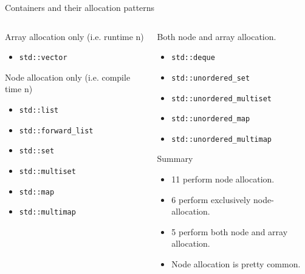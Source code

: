 \documentclass[10pt,aspectratio=169]{beamer}
\begin{document}
\begin{frame}{Containers and their allocation patterns}
\begin{columns}
\begin{column}{0.5\textwidth}
Array allocation only (i.e. runtime n)
\begin{itemize}
\item \texttt{std::vector}
\end{itemize}

Node allocation only (i.e. compile time n)
\begin{itemize}
\item \texttt{std::list}
\item \texttt{std::forward\_list}
\item \texttt{std::set}
\item \texttt{std::multiset}
\item \texttt{std::map}
\item \texttt{std::multimap}
\end{itemize}
\end{column}

\begin{column}{0.5\textwidth}
Both node and array allocation.
\begin{itemize}
\item \texttt{std::deque}
\item \texttt{std::unordered\_set}
\item \texttt{std::unordered\_multiset}
\item \texttt{std::unordered\_map}
\item \texttt{std::unordered\_multimap}
\end{itemize}
Summary
\begin{itemize}
\item 11 perform node allocation.
\item 6 perform exclusively node-allocation.
\item 5 perform both node and array allocation.
\item Node allocation is pretty common.
\end{itemize}

\end{column}
\end{columns}
\end{frame}
\end{document}
